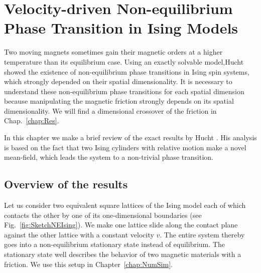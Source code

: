 
\chapter{Velocity-driven Non-equilibrium Phase Transition in Ising Models}\label{ch:review}

Two moving magnets sometimes gain their magnetic orders at a higher temperature than its equilibrium case. Using an exactly solvable model,Hucht \cite{Hucht2009b} showed the existence of non-equilibrium phase transitions in Ising spin systems, which strongly depended on their spatial dimensionality. It is necessary to understand these non-equilibrium phase transitions for each spatial dimension because manipulating the magnetic friction strongly depends on its spatial dimensionality. We will find a dimensional crossover of the friction in Chap.~\ref{chap:Res}.

In this chapter we make a brief review of the exact results by Hucht \cite{Hucht2009b}. His analysis is based on the fact that two Ising cylinders with relative motion make a novel mean-field, which leads the system to a non-trivial phase transition.

\section{Overview of the results}

Let us consider two equivalent square lattices of the Ising model each of which contacts the other by one of its one-dimensional boundaries (see Fig.~\ref{fig:SketchNEIsing}). We make one lattice slide along the contact plane against the other lattice with a constant velocity $v$. The entire system thereby goes into a non-equilibrium stationary state instead of equilibrium. The stationary state well describes the behavior of two magnetic materials with a friction. We use this setup in Chapter~\ref{chap:NumSim}.

